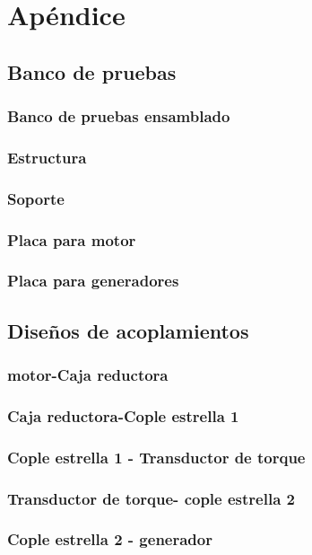 \chapter{Apéndice}

\section{Banco de pruebas} 
\subsection{Banco de pruebas ensamblado} 
\subsection{Estructura} 
\subsection{Soporte}
\subsection{Placa para motor}
\subsection{Placa para generadores}

\section{Diseños de acoplamientos} 
\subsection{motor-Caja reductora}
\subsection{Caja reductora-Cople estrella 1} 
\subsection{Cople estrella 1 - Transductor de torque}
\subsection{Transductor de torque- cople estrella 2}
\subsection{Cople estrella 2 - generador} 
